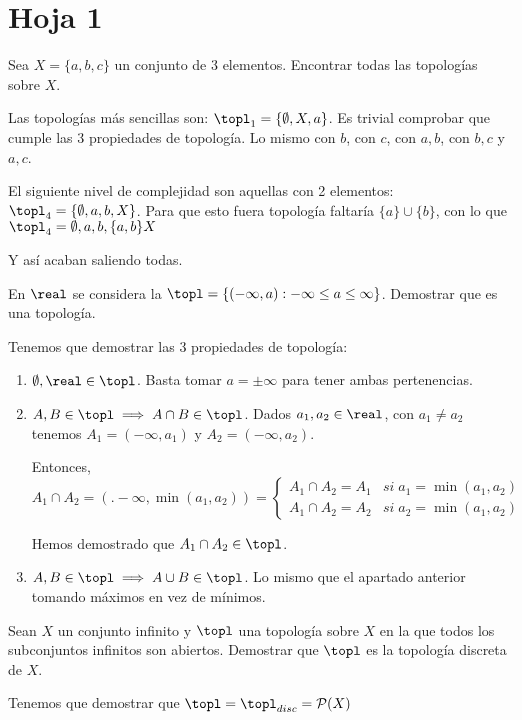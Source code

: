 
\section{Hoja 1}

\begin{problem}[1]
Sea $X=\{a,b,c\}$ un conjunto de 3 elementos. Encontrar todas las topologías sobre $X$.
\solution

Las topologías más sencillas son: $\topl_1 = \{\emptyset,X,a\}$. Es trivial comprobar que cumple las 3 propiedades de topología. Lo mismo con $b$, con $c$, con ${a,b}$, con ${b,c}$ y ${a,c}$.

El siguiente nivel de complejidad son aquellas con 2 elementos: $\topl_4 = \{\emptyset,a,b,X\}$. Para que esto fuera topología faltaría $\{a\} \cup \{b\}$, con lo que $\topl_4 = {\emptyset,a,b,\{a,b\}X}$

Y así acaban saliendo todas.
\end{problem}

\begin{problem}[2]
En $\real$ se considera la $\topl =\{(-\infty,a): -\infty \leq a \leq \infty\}$. Demostrar que es una topología.
\solution

Tenemos que demostrar las 3 propiedades de topología:

\begin{enumerate}
\item $\emptyset,\real \in \topl$. Basta tomar $a=\pm \infty$ para tener ambas pertenencias.
\item $A,B\in\topl \implies A\cap B\in\topl$. Dados $a_1,a_2\in\real$, con $a_1\neq a_2$ tenemos $A_1 = (-\infty,a_1)$ y $A_2 = (-\infty,a_2)$.

Entonces, $A_1\cap A_2 = (.-\infty,\min(a_1,a_2)) = \left\{\begin{array}{cc}
A_1\cap A_2 = A_1 & si\; a_1 = \min(a_1,a_2)\\A_1\cap A_2 = A_2  & si\; a_2 = \min(a_1,a_2)
\end{array}\right.$

Hemos demostrado que $A_1 \cap A_2 \in \topl$.

\item $A,B\in\topl \implies A\cup B\in\topl$. Lo mismo que el apartado anterior tomando máximos en vez de mínimos.
\end{enumerate}
\end{problem}


\begin{problem}[3]
Sean $X$ un conjunto infinito y $\topl$ una topología sobre $X$ en la que todos los subconjuntos infinitos son abiertos. Demostrar que $\topl$ es la topología discreta de $X$.
\solution

Tenemos que demostrar que $\topl = \topl_{disc} = \mathcal{P}(X)$
\end{problem}

